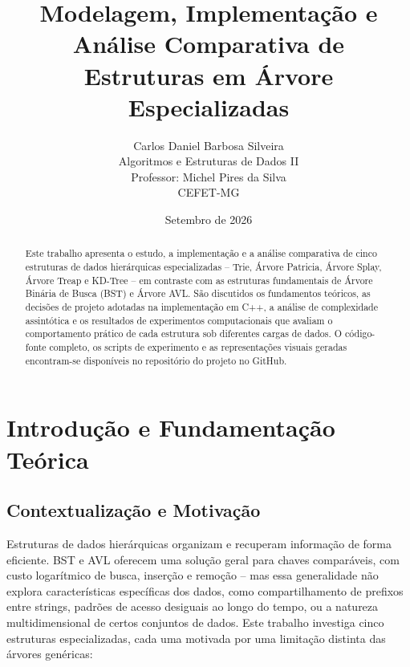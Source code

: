\documentclass[11pt]{article}
\title{Modelagem, Implementação e Análise Comparativa de\\
Estruturas em Árvore Especializadas}
\author{Carlos Daniel Barbosa Silveira \\ Algoritmos e Estruturas de Dados II \\ Professor: Michel Pires da Silva \\ CEFET-MG}
\date{Setembro de 2026}
\begin{document}
\maketitle

\begin{abstract}
Este trabalho apresenta o estudo, a implementação e a análise comparativa de cinco
estruturas de dados hierárquicas especializadas -- Trie, Árvore Patricia, Árvore
Splay, Árvore Treap e KD-Tree -- em contraste com as estruturas fundamentais de
Árvore Binária de Busca (BST) e Árvore AVL. São discutidos os fundamentos teóricos,
as decisões de projeto adotadas na implementação em C++, a análise de complexidade
assintótica e os resultados de experimentos computacionais que avaliam o
comportamento prático de cada estrutura sob diferentes cargas de dados. O código-fonte
completo, os scripts de experimento e as representações visuais geradas encontram-se
disponíveis no repositório do projeto no GitHub.
\end{abstract}

\vspace{0.5cm}
\tableofcontents

\newpage

\section{Introdução e Fundamentação Teórica}

\subsection{Contextualização e Motivação}

Estruturas de dados hierárquicas organizam e recuperam informação de forma
eficiente. BST e AVL oferecem uma solução geral para chaves comparáveis, com
custo logarítmico de busca, inserção e remoção -- mas essa generalidade não
explora características específicas dos dados, como compartilhamento de
prefixos entre strings, padrões de acesso desiguais ao longo do tempo, ou a
natureza multidimensional de certos conjuntos de dados. Este trabalho investiga
cinco estruturas especializadas, cada uma motivada por uma limitação distinta
das árvores genéricas:
\end{document}
